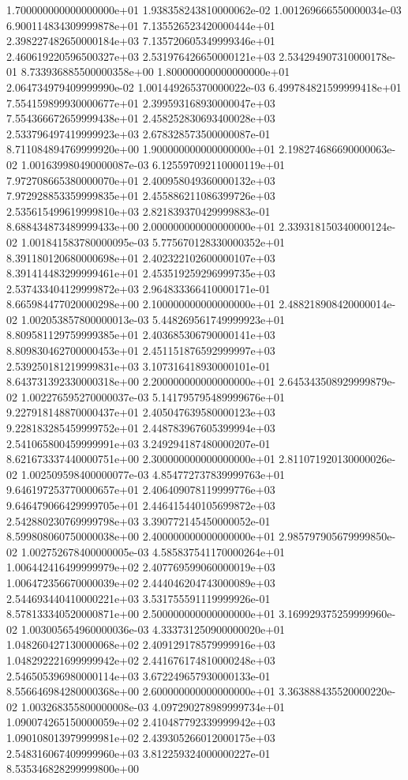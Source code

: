 \documentclass{article}
\begin{document}
\begin{center}
{1.700000000000000000e+01 1.938358243810000062e-02 1.001269666550000034e-03 6.900114834309999878e+01 7.135526523420000444e+01 2.398227482650000184e+03 7.135720605349999346e+01 2.460619220596500327e+03 2.531976426650000121e+03 2.534294907310000178e-01 8.733936885500000358e+00
1.800000000000000000e+01 2.064734979409999990e-02 1.001449265370000022e-03 6.499784821599999418e+01 7.554159899930000677e+01 2.399593168930000047e+03 7.554366672659999438e+01 2.458252830693400028e+03 2.533796497419999923e+03 2.678328573500000087e-01 8.711084894769999920e+00
1.900000000000000000e+01 2.198274686690000063e-02 1.001639980490000087e-03 6.125597092110000119e+01 7.972708665380000070e+01 2.400958049360000132e+03 7.972928853359999835e+01 2.455886211086399726e+03 2.535615499619999810e+03 2.821839370429999883e-01 8.688434873489999433e+00
2.000000000000000000e+01 2.339318150340000124e-02 1.001841583780000095e-03 5.775670128330000352e+01 8.391180120680000698e+01 2.402322102600000107e+03 8.391414483299999461e+01 2.453519259296999735e+03 2.537433404129999872e+03 2.964833366410000171e-01 8.665984477020000298e+00
2.100000000000000000e+01 2.488218908420000014e-02 1.002053857800000013e-03 5.448269561749999923e+01 8.809581129759999385e+01 2.403685306790000141e+03 8.809830462700000453e+01 2.451151876592999997e+03 2.539250181219999831e+03 3.107316418930000101e-01 8.643731392330000318e+00
2.200000000000000000e+01 2.645343508929999879e-02 1.002276595270000037e-03 5.141795795489999676e+01 9.227918148870000437e+01 2.405047639580000123e+03 9.228183285459999752e+01 2.448783967605399994e+03 2.541065800459999991e+03 3.249294187480000207e-01 8.621673337440000751e+00
2.300000000000000000e+01 2.811071920130000026e-02 1.002509598400000077e-03 4.854772737839999763e+01 9.646197253770000657e+01 2.406409078119999776e+03 9.646479066429999705e+01 2.446415440105699872e+03 2.542880230769999798e+03 3.390772145450000052e-01 8.599808060750000038e+00
2.400000000000000000e+01 2.985797905679999850e-02 1.002752678400000005e-03 4.585837541170000264e+01 1.006442416499999979e+02 2.407769599060000019e+03 1.006472356670000039e+02 2.444046204743000089e+03 2.544693440410000221e+03 3.531755591119999926e-01 8.578133340520000871e+00
2.500000000000000000e+01 3.169929375259999960e-02 1.003005654960000036e-03 4.333731250900000020e+01 1.048260427130000068e+02 2.409129178579999916e+03 1.048292221699999942e+02 2.441676174810000248e+03 2.546505396980000114e+03 3.672249657930000133e-01 8.556646984280000368e+00
2.600000000000000000e+01 3.363888435520000220e-02 1.003268355800000008e-03 4.097290278989999734e+01 1.090074265150000059e+02 2.410487792339999942e+03 1.090108013979999981e+02 2.439305266012000175e+03 2.548316067409999960e+03 3.812259324000000227e-01 8.535346828299999800e+00
}
\end{center}
\end{document}
